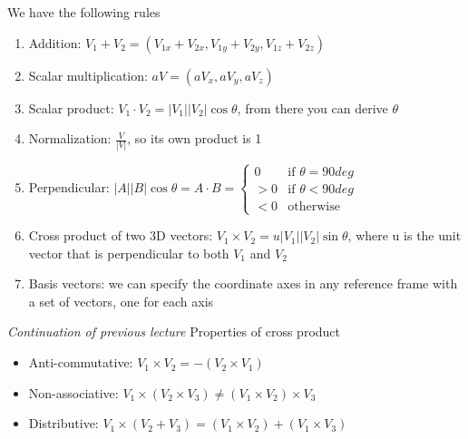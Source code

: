 \documentclass[11pt]{article}
\begin{document}
We have the following rules
\begin{enumerate}
    \item Addition: $V_1 + V_2 = (V_{1x} + V_{2x}, V_{1y} + V_{2y}, V_{1z} + V_{2z})$
    \item Scalar multiplication: $aV = (aV_x, aV_y, aV_z)$
    \item Scalar product: $V_1 \cdot V_2 = |V_1||V_2|\cos \theta$, from there you can derive $\theta$    
    \item Normalization: $\frac{V}{|V|}$, so its own product is 1
    \item Perpendicular: $|A||B|\cos \theta = A \cdot B =
     \begin{cases}
        0 & \text{if } \theta = 90 deg\\
        > 0 & \text{if }\theta < 90 deg\\
        < 0 & \text{otherwise}
    \end{cases}$  
    \item Cross product of two 3D vectors: $V_1 \times V_2 = u |V_1||V_2|\sin \theta$, where u is the unit vector that is perpendicular to both $V_1$ and $V_2$ %
    \item Basis vectors: we can specify the coordinate axes in any reference frame with a set of vectors, one for each axis
\end{enumerate}

\textit{Continuation of previous lecture}
Properties of cross product
\newline
\begin{itemize}
    \item Anti-commutative: $V_1 \times V_2 = -(V_2 \times V_1)$
    \item Non-associative: $V_1 \times (V_2 \times V_3) \neq (V_1 \times V_2) \times V_3$
    \item Distributive: $V_1 \times (V_2 + V_3) = (V_1 \times V_2) + (V_1 \times V_3)$   
\end{itemize}
\end{document}
